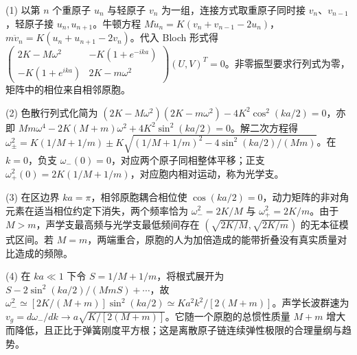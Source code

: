 (1) 以第 \(n\) 个重原子 \(u_n\) 与轻原子 \(v_n\) 为一组，连接方式取重原子同时接 \(v_n\)、\(v_{n-1}\)，轻原子接 \(u_n,u_{n+1}\)。牛顿方程 \(M\ddot u_n=K(v_n+v_{n-1}-2u_n)\)，\(m\ddot v_n=K(u_n+u_{n+1}-2v_n)\)。代入 Bloch 形式得 \(\begin{pmatrix}2K-M\omega^2&-K(1+e^{-ika})\\-K(1+e^{ika})&2K-m\omega^2\end{pmatrix}(U,V)^T=0\)。非零振型要求行列式为零，矩阵中的相位来自相邻原胞。

(2) 色散行列式化简为 \((2K-M\omega^2)(2K-m\omega^2)-4K^2\cos^2(ka/2)=0\)，亦即 \(Mm\omega^4-2K(M+m)\omega^2+4K^2\sin^2(ka/2)=0\)。解二次方程得 \(\omega_\pm^2=K(1/M+1/m)\pm K\sqrt{(1/M+1/m)^2-4\sin^2(ka/2)/(Mm)}\)。在 \(k=0\)，负支 \(\omega_-(0)=0\)，对应两个原子同相整体平移；正支 \(\omega_+^2(0)=2K(1/M+1/m)\)，对应胞内相对运动，称为光学支。

(3) 在区边界 \(ka=\pi\)，相邻原胞耦合相位使 \(\cos(ka/2)=0\)，动力矩阵的非对角元素在适当相位约定下消失，两个频率恰为 \(\omega_-^2=2K/M\) 与 \(\omega_+^2=2K/m\)。由于 \(M>m\)，声学支最高频与光学支最低频间存在 \((\sqrt{2K/M},\sqrt{2K/m})\) 的无本征模式区间。若 \(M=m\)，两端重合，原胞的人为加倍造成的能带折叠没有真实质量对比造成的频隙。

(4) 在 \(ka\ll1\) 下令 \(S=1/M+1/m\)，将根式展开为 \(S-2\sin^2(ka/2)/(MmS)+\cdots\)，故 \(\omega_-^2\simeq[2K/(M+m)]\sin^2(ka/2)\simeq Ka^2k^2/[2(M+m)]\)。声学长波群速为 \(v_g=d\omega_-/dk\to a\sqrt{K/[2(M+m)]}\)。它随一个原胞的总惯性质量 \(M+m\) 增大而降低，且正比于弹簧刚度平方根；这是离散原子链连续弹性极限的合理量纲与趋势。
